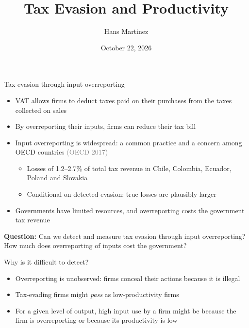 \documentclass[
  ignorenonframetext,
  aspectratio=169,
]{beamer}
\title{\texorpdfstring{Tax Evasion and
Productivity}{Tax Evasion and Productivity}}
\author{Hans Martinez}
\date{October 22, 2026}
\institute{Western University}
\providecommand{\tightlist}{%
  \setlength{\itemsep}{0pt}\setlength{\parskip}{0pt}}
\newcommand{\sm}[1]{\textcolor{gray}{\footnotesize #1}} %
\begin{document}

\begin{frame}
 \titlepage
\end{frame}



\begin{frame}{Tax evasion through input overreporting}
\protect{}\label{tax-evasion-through-input-overreporting}
\begin{itemize}
\tightlist
\item
  VAT allows firms to deduct taxes paid on their purchases from the
  taxes collected on sales
\item
  By overreporting their inputs, firms can reduce their tax bill
\item
  Input overreporting is widespread: a common practice and a concern
  among OECD countries \sm{(OECD 2017)}

  \begin{itemize}
  \tightlist
  \item
    Losses of 1.2--2.7\% of total tax revenue in Chile, Colombia,
    Ecuador, Poland and Slovakia
  \item
    Conditional on detected evasion: true losses are plausibly larger
  \end{itemize}
\item
  Governments have limited resources, and overreporting costs the
  government tax revenue
\end{itemize}

\medskip

\textbf{Question:} Can we detect and measure tax evasion through input
overreporting? How much does overreporting of inputs cost the
government?
\end{frame}

\begin{frame}{Why is it difficult to detect?}
\protect{}\label{why-is-it-difficult-to-detect}
\begin{itemize}
\tightlist
\item
  Overreporting is unobserved: firms conceal their actions because it is
  illegal
\item
  Tax-evading firms might \emph{pass} as low-productivity firms
\item
  For a given level of output, high input use by a firm might be because
  the firm is overreporting or because its productivity is low
\end{itemize}
\end{frame}
\end{document}
